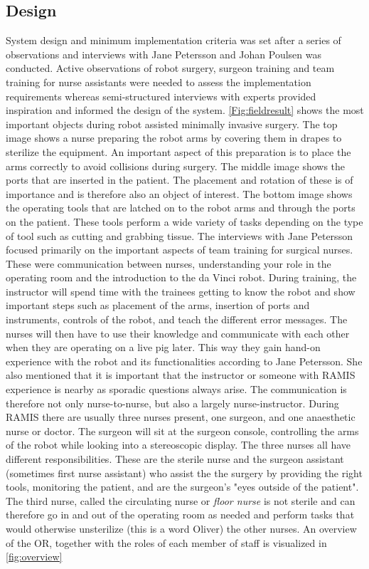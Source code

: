 \documentclass[conference]{IEEEtran}
\begin{document}
\subsection{Design}
System design and minimum implementation criteria was set after a series of observations and interviews with Jane Petersson and Johan Poulsen was conducted. Active observations of robot surgery, surgeon training and team training for nurse assistants were needed to assess the implementation requirements whereas semi-structured interviews with experts provided inspiration and informed the design of the system. 
\autoref{Fig:fieldresult} shows the most important objects during robot assisted minimally invasive surgery. The top image shows a nurse preparing the robot arms by covering them in drapes to sterilize the equipment. An important aspect of this preparation is to place the arms correctly to avoid collisions during surgery. The middle image shows the ports that are inserted in the patient. The placement and rotation of these is of importance and is therefore also an object of interest. The bottom image shows the operating tools that are latched on to the robot arms and through the ports on the patient. These tools perform a wide variety of tasks depending on the type of tool such as cutting and grabbing tissue.  
The interviews with Jane Petersson focused primarily on the important aspects of team training for surgical nurses. These were communication between nurses, understanding your role in the operating room and the introduction to the da Vinci robot. During training, the instructor will spend time with the trainees getting to know the robot and show important steps such as placement of the arms, insertion of ports and instruments, controls of the robot, and teach the different error messages. The nurses will then have to use their knowledge and communicate with each other when they are operating on a live pig later. This way they gain hand-on experience with the robot and its functionalities according to Jane Petersson. She also mentioned that it is important that the instructor or someone with RAMIS experience is nearby as sporadic questions always arise. The communication is therefore not only nurse-to-nurse, but also a largely nurse-instructor.
During RAMIS there are usually three nurses present, one surgeon, and one anaesthetic nurse or doctor. The surgeon will sit at the surgeon console, controlling the arms of the robot while looking into a stereoscopic display. The three nurses all have different responsibilities. These are the sterile nurse and the surgeon assistant (sometimes first nurse assistant) who assist the the surgery by providing the right tools, monitoring the patient, and are the surgeon's "eyes outside of the patient". The third nurse, called the circulating nurse or \textit{floor nurse} is not sterile and can therefore go in and out of the operating room as needed and perform tasks that would otherwise unsterilize (this is a word Oliver) the other nurses. An overview of the OR, together with the roles of each member of staff is visualized in \autoref{fig:overview} 
\end{document}
